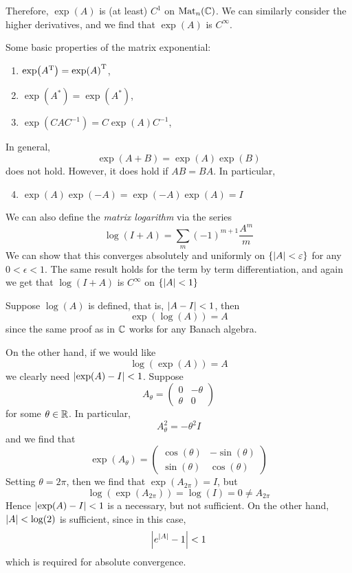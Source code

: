 \documentclass{article}
\begin{document}
Therefore, \(\exp(A)\) is (at least) \(C^1\) on \(\operatorname{Mat}_n(\mathbb{C})\). We can similarly consider the higher derivatives, and we find that \(\exp(A)\) is \(C^\infty\).

\begin{remark}
    Some basic properties of the matrix exponential:

    \begin{enumerate}
        \item \(\exp(A^{\mathrm{T}}) = \exp(A)^{\mathrm{T}}\),
        \item \(\exp(A^*) = \exp(A^*)\),
        \item \(\exp(CAC^{-1}) = C\exp(A)C^{-1}\),
    \end{enumerate}

    In general,
    \[\exp(A + B) = \exp(A)\exp(B)\]
    does not hold. However, it does hold if \(AB = BA\). In particular,

    \begin{enumerate}
        \setcounter{enumi}{3}
        \item \(\exp(A)\exp(-A) = \exp(-A)\exp(A) = I\)
    \end{enumerate}
\end{remark}

We can also define the \emph{matrix logarithm} via the series
\[\log(I + A) = \sum_m(-1)^{m+1}\frac{A^m}{m}\]
We can show that this converges absolutely and uniformly on \(\{\abs{A} < \varepsilon\}\) for any \(0 < \epsilon < 1\). The same result holds for the term by term differentiation, and again we get that \(\log(I + A)\) is \(C^\infty\) on \(\{\abs{A} < 1\}\)

Suppose \(\log(A)\) is defined, that is, \(\abs{A - I} < 1\), then
\[\exp(\log(A)) = A\]
since the same proof as in \(\mathbb{C}\) works for any Banach algebra.

On the other hand, if we would like
\[\log(\exp(A)) = A\]
we clearly need \(\abs{\exp(A) - I} < 1\). Suppose
\[A_\theta = \begin{pmatrix}
    0 & -\theta \\
    \theta & 0
\end{pmatrix}\]
for some \(\theta \in \mathbb{R}\). In particular,
\[A_\theta^2 = -\theta^2I\]
and we find that
\[\exp(A_\theta) = \begin{pmatrix}
    \cos(\theta) & -\sin(\theta) \\
    \sin(\theta) & \cos(\theta)
\end{pmatrix}\]
Setting \(\theta = 2\pi\), then we find that \(\exp(A_{2\pi}) = I\), but
\[\log(\exp(A_{2\pi})) = \log(I) = 0 \ne A_{2\pi}\]
Hence \(\abs{\exp(A) - I} < 1\) is a necessary, but not sufficient. On the other hand, \(\abs{A} < \log(2)\) is sufficient, since in this case,
\[\abs{e^\abs{A} - 1} < 1\]
which is required for absolute convergence.
\end{document}
